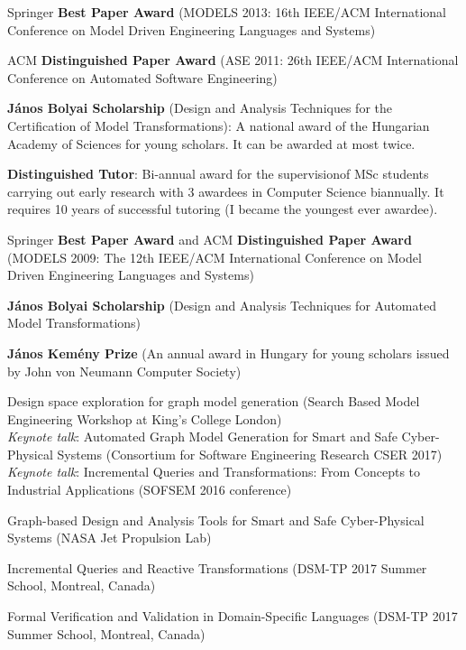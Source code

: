 \documentclass{xetexCV}
\begin{document}
Springer  \textbf{Best Paper Award} (MODELS 2013: 16th IEEE/ACM International Conference on Model Driven 
Engineering Languages and Systems) 

ACM \textbf{Distinguished Paper Award} (ASE 2011: 26th IEEE/ACM International Conference on Automated Software Engineering) 

\textbf{J\'anos Bolyai Scholarship} (Design and Analysis Techniques for the Certification of Model Transformations): A national award of the Hungarian Academy of Sciences for young scholars. It can be awarded
at most twice.

\textbf{Distinguished Tutor}:  Bi-annual award for the supervisionof MSc students carrying out early research with 3 awardees in Computer Science biannually. It requires 10 years of successful tutoring (I became the youngest ever awardee). 

Springer \textbf{Best Paper Award} and ACM \textbf{Distinguished Paper Award} \newline (MODELS
2009: The 12th IEEE/ACM International Conference on Model Driven Engineering Languages and
Systems) 

\textbf{J\'anos Bolyai Scholarship}  (Design and Analysis Techniques
for Automated Model Transformations) 

\textbf{J\'anos Kem\'eny Prize } (An annual
award in Hungary for young scholars issued by John von Neumann Computer Society)


Design space exploration  for graph model generation  (Search Based Model Engineering Workshop at King's College London) \\ 

\emph{Keynote talk}: Automated  Graph Model Generation for Smart and Safe Cyber-Physical Systems (Consortium for Software Engineering Research CSER 2017) \\

\emph{Keynote talk}:  Incremental Queries and Transformations: From Concepts to Industrial Applications  (SOFSEM 2016 conference) 

Graph-based  Design and Analysis Tools for Smart and Safe Cyber-Physical Systems (NASA Jet Propulsion Lab) 

Incremental Queries and Reactive Transformations (DSM-TP 2017 Summer School, Montreal, Canada)

Formal Verification and Validation in Domain-Specific Languages (DSM-TP 2017 Summer School, Montreal, Canada)
	
\end{document}
